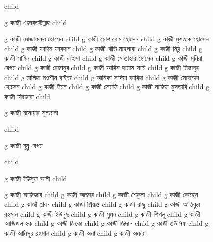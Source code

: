 \documentclass{article}
\begin{document}
\begin{figure}
{\begin{genealogypicture}
{{{{{        }
      }
        child{
        g{ কাজী এজারতউল্লাহ  }
          child{    g{ কাজী মোজাফফর হোসেন }
              child{
                g{ কাজী মোশাররফ হোসেন }
                  child{    g{ কাজী মুশতাক হোসেন }
                    child{    g{ কাজী ফাহিম ফারহান }   }
                    child{    g{ কাজী ঋতি মাহপারা }   }
                  }
                  child{    g{ কাজী মিঠু }
                    child{    g{ কাজী সামিন  }   }
                    child{    g{ কাজী লাইসা }   }
                  }
              }
              child{
              g{ কাজী মোতাহার হোসেন  }
              child{    g{ কাজী মুনিরা বেগম }   }
              child{    g{ কাজী রেজানুর  } 
                  child{    g{ কাজী আরিফ হামাম সামি }   }
              }
              child{    g{ কাজী মিজানুর }  
                  child{    g{ মালিহা নওশীন রাইতা    }   }
                  child{    g{ আনিকা সাদিয়া ফারিহা }   }
              }
            }
            child{
              g{ কাজী মোহাম্মদ হোসেন }
              child{    g{ কাজী ইমন  } 
                child{ g{ কাজী সেমন্তি }  }
                }
              child{    g{ কাজী নাজিয়া মুসতারি }
              child{ g{ কাজী ফিডোরা  }  }
              }
            }
            child{
              g{ কাজী মনোয়ার সুলতানা }

            }%
            child{
              g{ কাজী মুন্নু বেগম }

            }

          }       
        }
      }
      child{
        g{ কাজী ইউসুফ আলী }
          child{    g{ কাজী আজিজার } 
              child{    g{ কাজী আক্তার }
                child{    g{ কাজী শেকুলা }   }
                child{    g{ কাজী কোহেন } 
                    child{    g{ কাজী প্লাবন }   }
                    child{    g{ কাজী প্রিয়ন্তি }   }
                  }
                child{    g{ কাজী রাজু }   }  
              }
              child{    g{ কাজী আতিকুর রহমান }   }
              child{    g{ কাজী ইউনুছ } 
                  child{    g{ কাজী সুমন }   }
                  child{    g{ কাজী শিপলু  }   }
              }
              child{    g{ কাজী আজিজল হক }
                  child{    g{ কাজী জিকো } child{    g{ কাজী জিদান }   }   }
                  child{    g{ কাজী তউসিফ }   }
              }
              child{    g{ কাজী আনিসুর রহমান } 
                  child{    g{ কাজী অনা  }   }
                  child{    g{ কাজী অনন্যা }   }
              }

}}}}
\end{genealogypicture}}
\end{figure}
\end{document}
